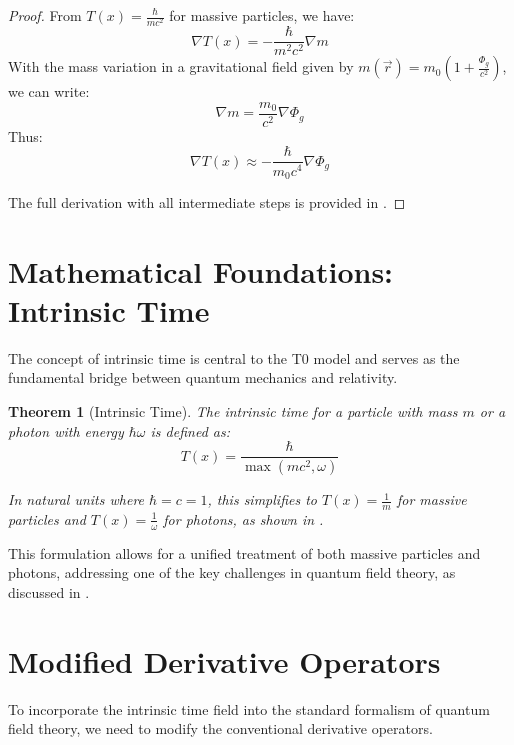 \documentclass[12pt,a4paper]{article}
\newcommand{\Tfield}{T(x)}
\newtheorem{theorem}{Theorem}[section]
\theoremstyle{definition}
\theoremstyle{remark}
\begin{document}
	\begin{proof}
		From \( \Tfield = \frac{\hbar}{m c^2} \) for massive particles, we have:
		\begin{equation}
			\nabla \Tfield = -\frac{\hbar}{m^2 c^2} \nabla m
		\end{equation}
		With the mass variation in a gravitational field given by \( m(\vec{r}) = m_0 (1 + \frac{\Phi_g}{c^2}) \), we can write:
		\begin{equation}
			\nabla m = \frac{m_0}{c^2} \nabla \Phi_g
		\end{equation}
		Thus:
		\begin{equation}
			\nabla \Tfield \approx -\frac{\hbar}{m_0 c^4} \nabla \Phi_g
		\end{equation}
		
		The full derivation with all intermediate steps is provided in \cite{pascher_emergente_gravitation_2025}.
	\end{proof}
	
	\section{Mathematical Foundations: Intrinsic Time}
	The concept of intrinsic time is central to the T0 model and serves as the fundamental bridge between quantum mechanics and relativity.
	
	\begin{theorem}[Intrinsic Time]
		The intrinsic time for a particle with mass \(m\) or a photon with energy \(\hbar\omega\) is defined as:
		\begin{equation}
			\Tfield = \frac{\hbar}{\max(m c^2, \omega)}
		\end{equation}
		
		In natural units where \(\hbar = c = 1\), this simplifies to \(\Tfield = \frac{1}{m}\) for massive particles and \(\Tfield = \frac{1}{\omega}\) for photons, as shown in \cite{pascher_alpha_2025}.
	\end{theorem}
	
	This formulation allows for a unified treatment of both massive particles and photons, addressing one of the key challenges in quantum field theory, as discussed in \cite{pascher_photons_2025}.
	
	\section{Modified Derivative Operators}
	To incorporate the intrinsic time field into the standard formalism of quantum field theory, we need to modify the conventional derivative operators.
	
\end{document}
